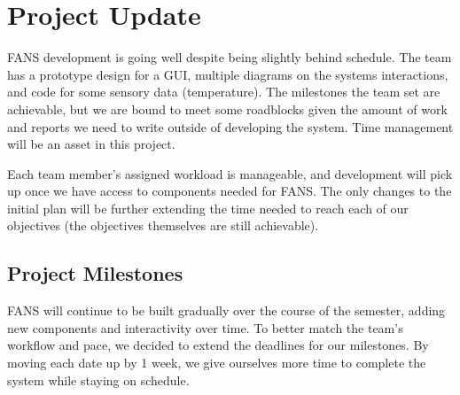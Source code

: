 \section{Project Update}

FANS development is going well despite being slightly behind schedule. The team has a prototype design for a GUI,
multiple diagrams on the systems interactions, and code for some sensory data (temperature). The milestones the team
set are achievable, but we are bound to meet some roadblocks given the amount of work and reports we need to write
outside of developing the system. Time management will be an asset in this project.

Each team member's assigned workload is manageable, and development will pick up once we have access to components
needed for FANS. The only changes to the initial plan will be further extending the time needed to reach each of our
objectives (the objectives themselves are still achievable).

\subsection{Project Milestones}

FANS will continue to be built gradually over the course of the semester, adding new components and interactivity over
time. To better match the team’s workflow and pace, we decided to extend the deadlines for our milestones. By moving
each date up by 1 week, we give ourselves more time to complete the system while staying on schedule.

